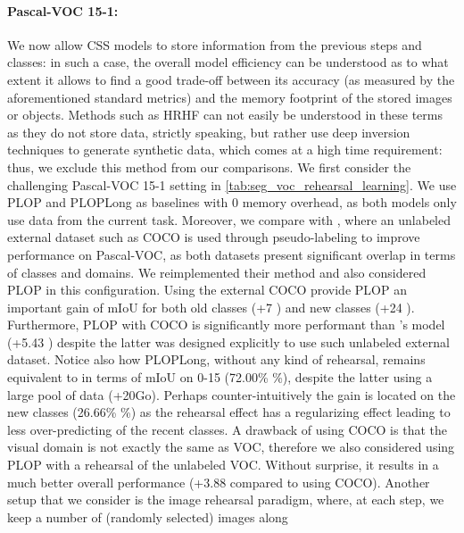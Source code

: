 \paragraph{Pascal-VOC 15-1:} We now allow \ac{CSS} models to store information from the previous
steps and classes: in such a case, the overall model efficiency can be understood as to what extent
it allows to find a good trade-off between its accuracy (as measured by the aforementioned standard
metrics) and the memory footprint of the stored images or objects. Methods such as HRHF
\citep{huang2021halfrealhalffake} can not easily be understood in these terms as they do not store
data, strictly speaking, but rather use deep inversion \citep{yin20deepinversion} techniques to
generate synthetic data, which comes at a high time requirement: thus, we exclude this method from
our comparisons. We first consider the challenging Pascal-VOC 15-1 setting in
\autoref{tab:seg_voc_rehearsal_learning}. We use PLOP and PLOPLong as baselines with 0 memory
overhead, as both models only use data from the current task. Moreover, we compare with
\citet{yu2020continualsegmentationselftraining}, where an unlabeled external dataset such as COCO
\citep{lin2014mscocodataset} is used through pseudo-labeling to improve performance on Pascal-VOC,
as both datasets present significant overlap in terms of classes and domains. We reimplemented their
method and also considered PLOP in this configuration. Using the external COCO provide PLOP an
important gain of \ac{mIoU} for both old classes (+7 \pp) and new classes (+24 \pp). Furthermore,
PLOP with COCO is significantly more performant than
\citet{yu2020continualsegmentationselftraining}'s model (+5.43 \pp) despite the latter was designed
explicitly to use such unlabeled external dataset. Notice also how PLOPLong, without any kind of
rehearsal, remains equivalent to \citet{yu2020continualsegmentationselftraining} in terms of
\ac{mIoU} on 0-15 (72.00\% \%), despite the latter using a large pool of data (+20Go).
Perhaps counter-intuitively the gain is located on the new classes (26.66\% \%) as the
rehearsal effect has a regularizing effect leading to less over-predicting of the recent classes. A
drawback of using COCO is that the visual domain is not exactly the same as VOC, therefore we also
considered using PLOP with a rehearsal of the unlabeled VOC. Without surprise, it results in a much
better overall performance (+3.88 \pp compared to using COCO). Another setup that we consider is the
image rehearsal paradigm, where, at each step, we keep a number of (randomly selected) images along
